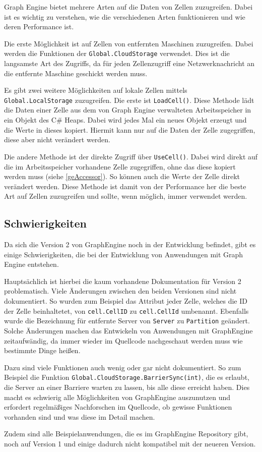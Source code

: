 Graph Engine bietet mehrere Arten auf die Daten von Zellen zuzugreifen. Dabei ist es wichtig zu verstehen, wie die verschiedenen Arten funktionieren und wie deren Performance ist.

Die erste Möglichkeit ist auf Zellen von entfernten Maschinen zuzugreifen. Dabei werden die Funktionen der \verb|Global.CloudStorage| verwendet. Dies ist die langsamste Art des Zugriffs, da für jeden Zellenzugriff eine Netzwerknachricht an die entfernte Maschine geschickt werden muss.

Es gibt zwei weitere Möglichkeiten auf lokale Zellen mittels \verb|Global.LocalStorage| zuzugreifen. Die erste ist \verb|LoadCell()|. Diese Methode lädt die Daten einer Zelle aus dem von Graph Engine verwalteten Arbeitsspeicher in ein Objekt des C\# Heaps.
Dabei wird jedes Mal ein neues Objekt erzeugt und die Werte in dieses kopiert. Hiermit kann nur auf die Daten der Zelle zugegriffen, diese aber nicht verändert werden.

Die andere Methode ist der direkte Zugriff über \verb|UseCell()|. Dabei wird direkt auf die im Arbeitsspeicher vorhandene Zelle zugegriffen, ohne das diese kopiert werden muss (siehe \ref{geAccessor}). So können auch die Werte der Zelle direkt verändert werden. Diese Methode ist damit von der Performance her die beste Art auf Zellen zuzugreifen und sollte, wenn möglich, immer verwendet werden.



\subsection{Schwierigkeiten}

Da sich die Version 2 von GraphEngine noch in der Entwicklung befindet, gibt es einige Schwierigkeiten, die bei der Entwicklung von Anwendungen mit Graph Engine entstehen.

Hauptsächlich ist hierbei die kaum vorhandene Dokumentation für Version 2 problematisch. Viele Änderungen zwischen den beiden Versionen sind nicht dokumentiert. So wurden zum Beispiel
das Attribut jeder Zelle, welches die ID der Zelle beinhaltetet, von \verb|cell.CellID| zu \verb|cell.CellId| umbenannt. Ebenfalls wurde die Bezeichnung für entfernte Server von \verb|Server| zu \verb|Partition| geändert.
Solche Änderungen machen das Entwickeln von Anwendungen mit GraphEngine zeitaufwändig, da immer wieder im Quellcode nachgeschaut werden muss wie bestimmte Dinge heißen. 

Dazu sind viele Funktionen auch wenig oder gar nicht dokumentiert. So zum Beispiel die Funktion \verb|Global.CloudStorage.BarrierSync(int)|, die es erlaubt, die Server an einer Barriere warten zu lassen, bis alle diese erreicht haben.
Dies macht es schwierig alle Möglichkeiten von GraphEngine auszunutzen und erfordert regelmäßiges Nachforschen im Quellcode, ob gewisse Funktionen vorhanden sind und was diese im Detail machen.

Zudem sind alle Beispielanwendungen, die es im GraphEngine Repository gibt, noch auf Version 1 und einige dadurch nicht kompatibel mit der neueren Version.


